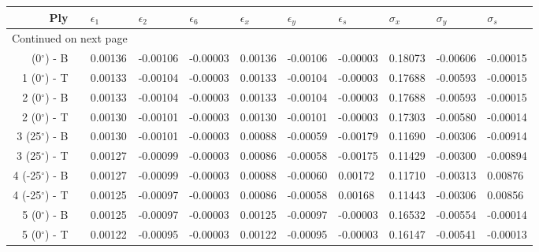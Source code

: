 \begin{table}[H]
\caption{Stresses are in [GPa].}
\begin{longtable}{@{}rllllllllll@{}}
\toprule
                 Ply &\phantom{a}&  $\epsilon_1$ &  $\epsilon_2$ &  $\epsilon_6$ &  $\epsilon_x$ &  $\epsilon_y$ &  $\epsilon_s$ &  $\sigma_x$ &  $\sigma_y$ &  $\sigma_s$ \\
\midrule
\endhead
\midrule
\multicolumn{3}{r}{{Continued on next page}} \\
\midrule
\endfoot

\bottomrule
\endlastfoot
   1 (0$^\circ$) - B &&       0.00136 &      -0.00106 &      -0.00003 &       0.00136 &      -0.00106 &      -0.00003 &     0.18073 &    -0.00606 &    -0.00015 \\
   1 (0$^\circ$) - T &&       0.00133 &      -0.00104 &      -0.00003 &       0.00133 &      -0.00104 &      -0.00003 &     0.17688 &    -0.00593 &    -0.00015 \\\midrule
   2 (0$^\circ$) - B & &      0.00133 &      -0.00104 &      -0.00003 &       0.00133 &      -0.00104 &      -0.00003 &     0.17688 &    -0.00593 &    -0.00015 \\
   2 (0$^\circ$) - T & &      0.00130 &      -0.00101 &      -0.00003 &       0.00130 &      -0.00101 &      -0.00003 &     0.17303 &    -0.00580 &    -0.00014 \\\midrule
  3 (25$^\circ$) - B &&       0.00130 &      -0.00101 &      -0.00003 &       0.00088 &      -0.00059 &      -0.00179 &     0.11690 &    -0.00306 &    -0.00914 \\
  3 (25$^\circ$) - T &&       0.00127 &      -0.00099 &      -0.00003 &       0.00086 &      -0.00058 &      -0.00175 &     0.11429 &    -0.00300 &    -0.00894 \\\midrule
 4 (-25$^\circ$) - B &&       0.00127 &      -0.00099 &      -0.00003 &       0.00088 &      -0.00060 &       0.00172 &     0.11710 &    -0.00313 &     0.00876 \\
 4 (-25$^\circ$) - T &&       0.00125 &      -0.00097 &      -0.00003 &       0.00086 &      -0.00058 &       0.00168 &     0.11443 &    -0.00306 &     0.00856 \\\midrule
   5 (0$^\circ$) - B &&       0.00125 &      -0.00097 &      -0.00003 &       0.00125 &      -0.00097 &      -0.00003 &     0.16532 &    -0.00554 &    -0.00014 \\
   5 (0$^\circ$) - T &&       0.00122 &      -0.00095 &      -0.00003 &       0.00122 &      -0.00095 &      -0.00003 &     0.16147 &    -0.00541 &    -0.00013 \\\midrule

\end{longtable}
\end{table}
